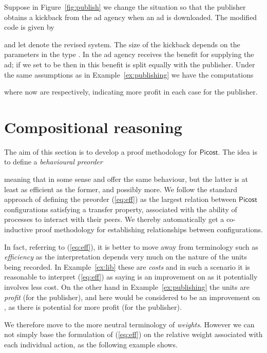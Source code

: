 \documentclass{LMCS}
\newcommand{\pfn}[1]{\mathsf{#1}}  \newcommand{\cfn}[1]{\mathsf{#1}}  \newcommand{\ownfnt}[1]{{\mathsf{#1}}}
\newcommand{\picost}{\ensuremath{\pfn{Picost}}\xspace}
\newcommand{\EndDefBox}{\null\hfill}
\newcommand{\boxHere}{\global\let\EndProof\empty\EndDefBox}
\begin{document}
\begin{exa}[Kickbacks]\label{ex:kickback}

Suppose in Figure~\ref{fig:publish} we change the situation so that the publisher obtains a kickback
from the ad agency when an ad is downloaded. The modified code
is given by

and let  denote the revised system. The size of the kickback depends on the parameters in the 
type . In  the ad agency receives the benefit  for supplying the ad; if we set  to be
 then in  this benefit is split equally with the publisher. 
Under the same assumptions as in Example~\ref{ex:publishing} we have the computations

where now  are   respectively, indicating more profit in each case
for the publisher. 
\boxHere
\end{exa}
\section{Compositional reasoning}\label{sec:lts}

The aim of this section is to develop a proof methodology 
for \picost. The idea is to define a  \emph{behavioural preorder} 

meaning that in some sense  and  offer the same behaviour, but the latter is at least as efficient
as the former, and possibly more.  We follow the standard approach
of defining the preorder (\ref{eq:eff}) as the largest relation
between \picost configurations satisfying a transfer property,
associated with the ability of processes to interact with their
peers. We thereby automatically get a co-inductive proof methodology
for establishing relationships between configurations. 


In fact, referring to (\ref{eq:eff}), it is better to move away from
terminology such as \emph{efficiency} as the interpretation 
depends very much on the nature of the units being
recorded. In Example~\ref{ex:lib} these are \emph{costs} and in such a
scenario it is reasonable to interpret (\ref{eq:eff}) as saying
 is an improvement on  as it
potentially involves less cost. On the other hand in
Example~\ref{ex:publishing} the units are \emph{profit} (for the publisher), and here
 would be considered to be an improvement on
, as there is potential for more profit (for the publisher).

We therefore move to the more neutral terminology of \emph{weights}.
However we can not simply base the formulation of (\ref{eq:eff}) on
the relative weight associated with each individual action, as the
following example shows.  \newcommand{\Up}{\cfn{up}}
\newcommand{\down}{\cfn{down}}
\end{document}

